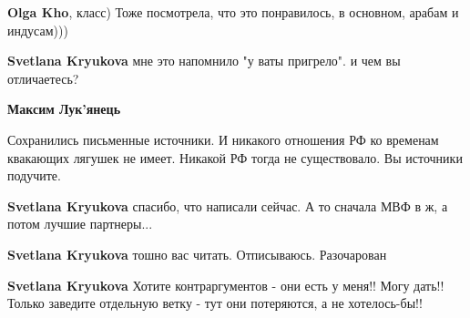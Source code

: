 \begin{itemize}
\begin{itemize}
\textbf{Olga Kho}, класс) Тоже посмотрела, что это понравилось, в основном, арабам и индусам)))

 
\textbf{Svetlana Kryukova} мне это напомнило "у ваты пригрело". и чем вы отличаетесь?

 
\textbf{Максим Лук'янець} 

Сохранились письменные источники. И никакого отношения РФ ко временам квакающих
лягушек не имеет. Никакой РФ тогда не существовало. Вы источники подучите.

 
\textbf{Svetlana Kryukova} спасибо, что написали сейчас. А то сначала МВФ в ж, а потом лучшие партнеры...

 
\textbf{Svetlana Kryukova} тошно вас читать. Отписываюсь. Разочарован

 
\textbf{Svetlana Kryukova} Хотите контраргументов - они есть у меня!! Могу дать!! Только заведите отдельную ветку - тут они потеряются, а не хотелось-бы!!

 

\end{itemize}
\end{itemize}
